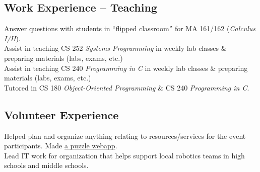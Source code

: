 \documentclass[11pt,letter,sans]{moderncv}
\begin{document}
\subsection{\textbf{Work Experience -- Teaching}}
Answer questions with students in ``flipped classroom'' for MA 161/162 (\textit{Calculus I/II}).
\\
Assist in teaching CS 252 \textit{Systems Programming} in weekly lab classes \& preparing materials (labs, exams, etc.)
\\
Assist in teaching CS 240 \textit{Programming in C} in weekly lab classes \& preparing materials (labs, exams, etc.)
\\
Tutored in CS 180 \textit{Object-Oriented Programming} \& CS 240 \textit{Programming in C}.
\subsection{\textbf{Volunteer Experience}}
Helped plan and organize anything relating to resources/services for the event participants.
Made \href{https://github.com/BoilerMake/puzzles-BM4}{\underline{a puzzle webapp}}.
\\
Lead IT work for organization that helps support local robotics teams in high schools and middle schools.
\end{document}
